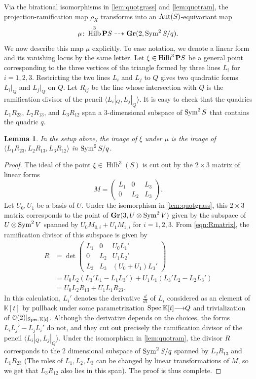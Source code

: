 \documentclass[11pt,reqno]{amsart}
\theoremstyle{plain}
\newtheorem{lemma}[theorem]{Lemma}
\theoremstyle{definition}
\theoremstyle{remark}
\numberwithin{equation}{section}
\renewcommand{\k}{\mathbb{K}}
\DeclareMathOperator{\Hilb}{Hilb}
\renewcommand{\to}{{\longrightarrow}}
\numberwithin{equation}{section}
\renewcommand{\O}{\mathcal O}
\begin{document}
Via the birational isomorphisms in \autoref{lem:quotgrass} and \autoref{lem:quotram}, the projection-ramification map $\rho_X$ transforms into an $\operatorname{Aut}(S)$-equivariant map
\[
  \mu \from \Hilb^3\P S \dashrightarrow \Gr(2, \Sym^2S/q).
\]
We now describe this map $\mu$ explicitly.
To ease notation, we denote a linear form and its vanishing locus by the same letter.
Let $\xi \in \Hilb^3 \P S$ be a general point corresponding to the three vertices of the triangle formed by three lines $L_i$ for $i = 1, 2, 3$.
Restricting the two lines $L_i$ and $L_j$ to $Q$ gives two quadratic forms $L_i|_Q$ and $L_j|_Q$ on $Q$.
Let $R_{ij}$ be the line whose intersection with $Q$ is the ramification divisor of the pencil $\langle  L_i|_Q, L_j|_Q \rangle$.
It is easy to check that the quadrics $L_1 R_{23}$, $L_2 R_{13}$, and $L_3R_{12}$ span a 3-dimensional subspace of $\operatorname{Sym}^2 S$ that contains the quadric $q$.
\begin{lemma}\label{lem:mu}
  In the setup above, the image of $\xi$ under $\mu$ is the image of $\langle  L_1R_{23}, L_2R_{13},L_3R_{12} \rangle$ in $\operatorname{Sym}^2S/q$.
\end{lemma}
\begin{proof}
  The ideal of the point $\xi \in \Hilb^3(S)$ is cut out by the $2 \times 3$ matrix of linear forms
  \[
    M =
    \begin{pmatrix}
      L_1 & 0 & L_3 \\
      0 & L_2 & L_3
    \end{pmatrix}.
  \]
  Let $U_0, U_1$ be a basis of $U$.
  Under the isomorphism in \autoref{lem:quotgrass}, this $2 \times 3$ matrix corresponds to the point of ${\bf Gr}(3, U \otimes \operatorname{Sym}^2 V)$ given by the subspace of $U \otimes \operatorname{Sym}^2 V$ spanned by $U_0 M_{0,i} + U_1 M_{1,i}$ for $i = 1, 2, 3$.
  From \eqref{eqn:Rmatrix}, the ramification divisor of this subspace is given by
  \begin{align*}
    R &= \det
    \begin{pmatrix}
      L_1 & 0 & U_0 L_1' \\
      0 & L_2 & U_1 L_2' \\
      L_3 & L_3 & (U_0+U_1)L_3'
    \end{pmatrix} \\
      &= U_0L_2(L_3'L_1 - L_1L_3') + U_1L_1(L_3'L_2-L_2L_3')\\
      &= U_0L_2R_{13} + U_1 L_1R_{23}.
  \end{align*}
  In this calculation, $L_i'$ denotes the derivative $\frac{d}{dt}$ of $L_i$ considered as an element of $\k[t]$ by pullback under some parametrization $\spec \k[t] \to Q$ and trivialization of $\O(2)|_{\spec \k[t]}$.
  Although the derivative depends on the choices, the forms $L_iL_j' - L_jL_i'$ do not, and they cut out precisely the ramification divisor of the pencil $\langle  L_i|_Q, L_j|_Q \rangle$.
  Under the isomorphism in \eqref{lem:quotram}, the divisor $R$ corresponds to the 2 dimensional subspace of $\operatorname{Sym}^2 S/q$ spanned by $L_2R_{13}$ and $L_1R_{23}$ (The roles of $L_1, L_2, L_3$ can be changed by linear transformations of $M$, so we get that $L_3R_{12}$ also lies in this span).
  The proof is thus complete.
\end{proof}
\end{document}

